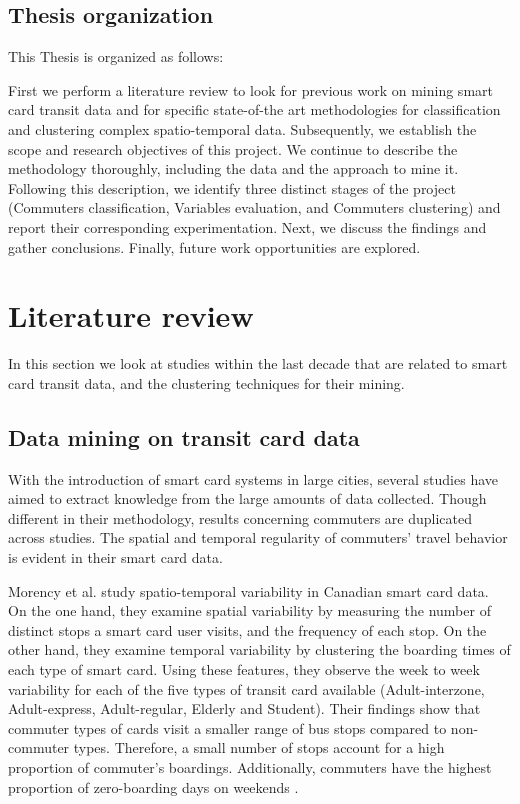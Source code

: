 \documentclass{article}
\begin{document}
\subsection{Thesis organization}
This Thesis is organized as follows:

First we perform a literature review to look for previous work on mining smart card transit data and for specific state-of-the art methodologies for classification and clustering complex spatio-temporal data. Subsequently, we establish the scope and research objectives of this project. We continue to describe the methodology thoroughly, including the data and the approach to mine it. Following this description, we identify three distinct stages of the project (Commuters classification, Variables evaluation, and Commuters clustering) and report their corresponding experimentation. Next, we discuss the findings and gather conclusions. Finally, future work opportunities are explored. 


\newpage
\section{Literature review}
In this section we look at studies within the last decade that are related to smart card transit data, and the clustering techniques for their mining. 

\subsection{Data mining on transit card data}
With the introduction of smart card systems in large cities, several studies have aimed to extract knowledge from the large amounts of data collected. Though different in their methodology, results concerning commuters are duplicated across studies. The spatial and temporal regularity of commuters' travel behavior is evident in their smart card data.


Morency et al. study spatio-temporal variability in Canadian smart card data. On the one hand, they examine spatial variability by measuring the number of distinct stops a smart card user visits, and the frequency of each stop. On the other hand, they examine temporal variability by clustering the boarding times of each type of smart card. Using these features, they observe the week to week variability for each of the five types of transit card available (Adult-interzone, Adult-express, Adult-regular, Elderly and Student). Their findings show that commuter types of cards visit a smaller range of bus stops compared to non-commuter types. Therefore, a small number of stops account for a high proportion of commuter's boardings. Additionally, commuters have the highest proportion of zero-boarding days on weekends \cite{morency2007measuring}.
\end{document}
